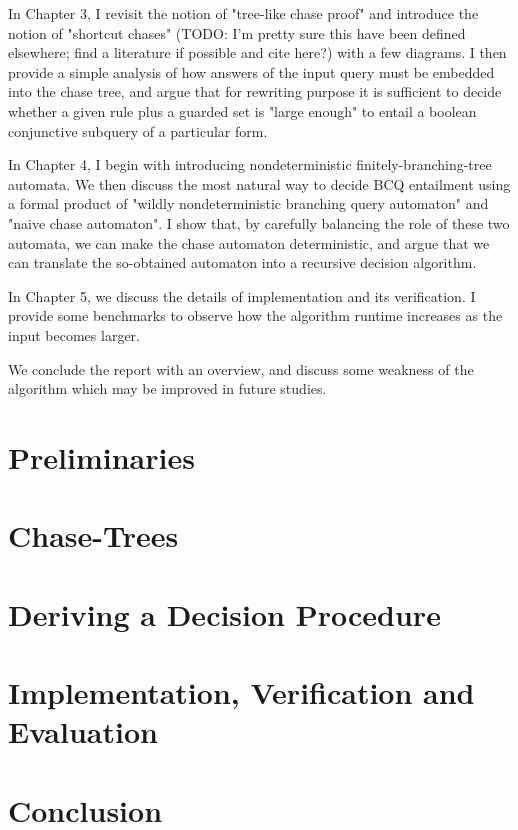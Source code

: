 \documentclass[12pt]{article}
\begin{document}
In Chapter 3, I revisit the notion of "tree-like chase proof" and introduce the notion of "shortcut chases" (TODO: I'm pretty sure this have been defined elsewhere; find a literature if possible and cite here?) with a few diagrams. I then provide a simple analysis of how answers of the input query must be embedded into the chase tree, and argue that for rewriting purpose it is sufficient to decide whether a given rule plus a guarded set is "large enough" to entail a boolean conjunctive subquery of a particular form.

In Chapter 4, I begin with introducing nondeterministic finitely-branching-tree automata. We then discuss the most natural way to decide BCQ entailment using a formal product of "wildly nondeterministic branching query automaton" and "naive chase automaton". I show that, by carefully balancing the role of these two automata, we can make the chase automaton deterministic, and argue that we can translate the so-obtained automaton into a recursive decision algorithm.

In Chapter 5, we discuss the details of implementation and its verification. I provide some benchmarks to observe how the algorithm runtime increases as the input becomes larger.

We conclude the report with an overview, and discuss some weakness of the algorithm which may be improved in future studies.

\newpage
\section{Preliminaries}

\newpage
\section{Chase-Trees}

\newpage
\section{Deriving a Decision Procedure}

\newpage
\section{Implementation, Verification and Evaluation}

\newpage
\section{Conclusion}

\printbibliography
\end{document}
